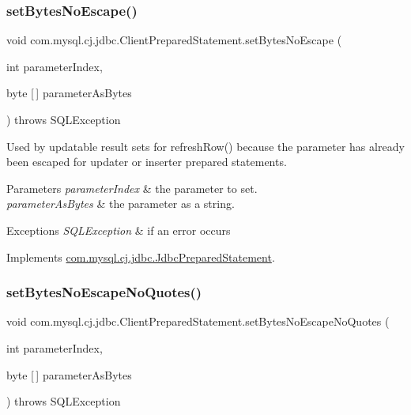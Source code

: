 \subsubsection{\texorpdfstring{set\+Bytes\+No\+Escape()}{setBytesNoEscape()}}
{\footnotesize\ttfamily void com.\+mysql.\+cj.\+jdbc.\+Client\+Prepared\+Statement.\+set\+Bytes\+No\+Escape (\begin{DoxyParamCaption}\item[{int}]{parameter\+Index,  }\item[{byte \mbox{[}$\,$\mbox{]}}]{parameter\+As\+Bytes }\end{DoxyParamCaption}) throws S\+Q\+L\+Exception}

Used by updatable result sets for refresh\+Row() because the parameter has already been escaped for updater or inserter prepared statements.


\begin{DoxyParams}{Parameters}
{\em parameter\+Index} & the parameter to set. \\
\hline
{\em parameter\+As\+Bytes} & the parameter as a string.\\
\hline
\end{DoxyParams}

\begin{DoxyExceptions}{Exceptions}
{\em S\+Q\+L\+Exception} & if an error occurs \\
\hline
\end{DoxyExceptions}


Implements \mbox{\hyperlink{interfacecom_1_1mysql_1_1cj_1_1jdbc_1_1_jdbc_prepared_statement_a46f072b1d5f3463b8371262dc5ed9ead}{com.\+mysql.\+cj.\+jdbc.\+Jdbc\+Prepared\+Statement}}.

\mbox{\label{classcom_1_1mysql_1_1cj_1_1jdbc_1_1_client_prepared_statement_a268b6e65cc67b813b8a4348498f3861b}} 
\subsubsection{\texorpdfstring{set\+Bytes\+No\+Escape\+No\+Quotes()}{setBytesNoEscapeNoQuotes()}}
{\footnotesize\ttfamily void com.\+mysql.\+cj.\+jdbc.\+Client\+Prepared\+Statement.\+set\+Bytes\+No\+Escape\+No\+Quotes (\begin{DoxyParamCaption}\item[{int}]{parameter\+Index,  }\item[{byte \mbox{[}$\,$\mbox{]}}]{parameter\+As\+Bytes }\end{DoxyParamCaption}) throws S\+Q\+L\+Exception}



